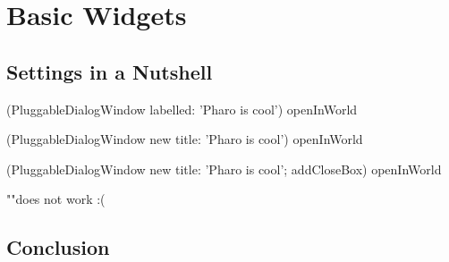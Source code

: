 \documentclass[a4paper,10pt,twoside]{book}
\begin{document}
\fi
\sloppy

\chapter{Basic Widgets}





\section{Settings in a Nutshell}

\begin{code}{}
(PluggableDialogWindow  labelled: 'Pharo is cool') openInWorld
\end{code}

\begin{code}{}
(PluggableDialogWindow new
	title: 'Pharo is cool') openInWorld
\end{code}

\begin{code}{}
(PluggableDialogWindow new
	title: 'Pharo is cool';
	addCloseBox) openInWorld
	
	""does not work :(
\end{code}

%
%

\section{Conclusion}

\ifx\wholebook\relax\else
   
   
\end{document}
